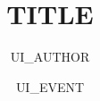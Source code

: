 \title{{{TITLE}}}
\author{{{UI_AUTHOR}}}
\date{{{UI_EVENT}}}



\begin{frame}
  \titlepage
\end{frame}

\begin{frame}{\contentsname}
  \tableofcontents
\end{frame}


